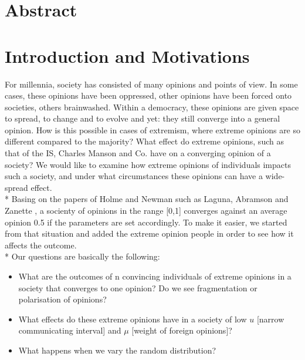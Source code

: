 \documentclass[11pt]{article}
\begin{document}

\tableofcontents

\newpage




\section{Abstract}

\section{Introduction and Motivations}
For millennia, society has consisted of many opinions and points of view. In some cases, these opinions have been oppressed, other opinions have been forced onto societies, others brainwashed. Within a democracy, these opinions are given space to spread, to change and to evolve and yet: they still converge into a general opinion. How is this possible in cases of extremism, where extreme opinions are so different compared to the majority? What effect do extreme opinions, such as that of the IS, Charles Manson and Co. have on a converging opinion of a society? We would like to examine how extreme opinions of individuals impacts such a society, and under what circumstances these opinions can have a wide-spread effect. \\*
Basing on the papers of Holme and Newman \cite{Coevolutions} such as Laguna, Abramson and Zanette \cite{Minor}, a socienty of opinions in the range [0,1] converges against an average opinion 0.5 if the parameters are set accordingly. To make it easier, we started from that situation and added the extreme opinion people in order to see how it affects the outcome. \\*
Our questions are basically the following: 
\begin{itemize}
\item What are the outcomes of n convincing individuals of extreme opinions in a society that converges to one opinion? Do we see fragmentation or polarisation of opinions?
\item What effects do these extreme opinions have in a society of low $u$ [narrow communicating interval] and $\mu$ [weight of foreign opinions]?
\item What happens when we vary the random distribution?
\end{itemize}
\end{document}
